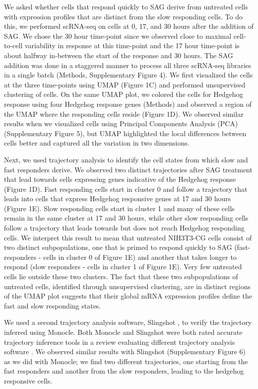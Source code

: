 We asked whether cells that respond quickly to SAG derive from untreated cells with expression profiles that are distinct from the slow responding cells. To do this, we performed scRNA-seq on cells at 0, 17, and 30 hours after the addition of SAG. We chose the 30 hour time-point since we observed close to maximal cell-to-cell variability in response at this time-point and the 17 hour time-point is about halfway in-between the start of the response and 30 hours. The SAG addition was done in a staggered manner to process all three scRNA-seq libraries in a single batch (Methods, Supplementary Figure 4). We first visualized the cells at the three time-points using UMAP (Figure 1C) and performed unsupervised clustering of cells. On the same UMAP plot, we colored the cells for Hedgehog response using four Hedgehog response genes (Methods) and observed a region of the UMAP where the responding cells reside (Figure 1D). We observed similar results when we visualized cells using Principal Components Analysis (PCA) (Supplementary Figure 5), but UMAP highlighted the local differences between cells better and captured all the variation in two dimensions.

Next, we used trajectory analysis \cite{Qiu2017-uz,Trapnell2014-ho} to identify the cell states from which slow and fast responders derive. We observed two distinct trajectories after SAG treatment that lead towards cells expressing genes indicative of the Hedgehog response (Figure 1D). Fast responding cells start in cluster 0 and follow a trajectory that leads into cells that express Hedgehog responsive genes at 17 and 30 hours (Figure 1E). Slow responding cells start in cluster 1 and many of these cells remain in the same cluster at 17 and 30 hours, while other slow responding cells follow a trajectory that leads towards but does not reach Hedgehog responding cells. We interpret this result to mean that untreated NIH3T3-CG cells consist of two distinct subpopulations, one that is primed to respond quickly to SAG (fast-responders - cells in cluster 0 of Figure 1E) and another that takes longer to respond (slow responders - cells in cluster 1 of Figure 1E). Very few untreated cells lie outside these two clusters. The fact that these two subpopulations of untreated cells, identified through unsupervised clustering, are in distinct regions of the UMAP plot suggests that their global mRNA expression profiles define the fast and slow responding states.

We used a second trajectory analysis software, Slingshot \cite{Street2018-ak}, to verify the trajectory inferred using Monocle. Both Monocle and Slingshot were both rated accurate trajectory inference tools in a review evaluating different trajectory analysis software \cite{Saelens2019-fq}. We observed similar results with Slingshot (Supplementary Figure 6) as we did with Monocle; we find two different trajectories, one starting from the fast responders and another from the slow responders, leading to the hedgehog responsive cells.

